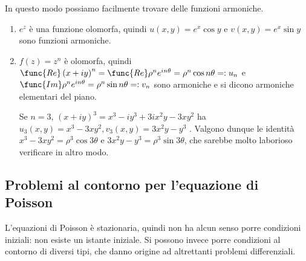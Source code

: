 \documentclass{article}
\begin{document}
In questo modo possiamo facilmente trovare delle funzioni armoniche.

\begin{enumerate}
\item $e^{z}$ \`{e} una funzione olomorfa, quindi $u\left( x,y\right)
=e^{x}\cos y$ e $v\left( x,y\right) =e^{x}\sin y$ sono funzioni armoniche.

\item $f\left( z\right) =z^{n}$ \`{e} olomorfa, quindi $\func{Re}\left(
x+iy\right) ^{n}=\func{Re}\rho ^{n}e^{in\theta }=\rho ^{n}\cos n\theta
=:u_{n}$ e $\func{Im}\rho ^{n}e^{in\theta }=\rho ^{n}\sin n\theta =:v_{n}$
sono armoniche e si dicono armoniche elementari del piano.

Se $n=3$, $\left( x+iy\right) ^{3}=x^{3}-iy^{3}+3ix^{2}y-3xy^{2}$ ha $%
u_{3}\left( x,y\right) =x^{3}-3xy^{2},v_{3}\left( x,y\right) =3x^{2}y-y^{3}$%
. Valgono dunque le identit\`{a} $x^{3}-3xy^{2}=\rho ^{3}\cos 3\theta $ e $%
3x^{2}y-y^{3}=\rho ^{3}\sin 3\theta $, che sarebbe molto laborioso
verificare in altro modo.
\end{enumerate}

\subsection{Problemi al contorno per l'equazione di Poisson}

L'equazioni di Poisson \`{e} stazionaria, quindi non ha alcun senso porre
condizioni iniziali: non esiste un istante iniziale. Si possono invece porre
condizioni al contorno di diversi tipi, che danno origine ad altrettanti
problemi differenziali.
\end{document}
